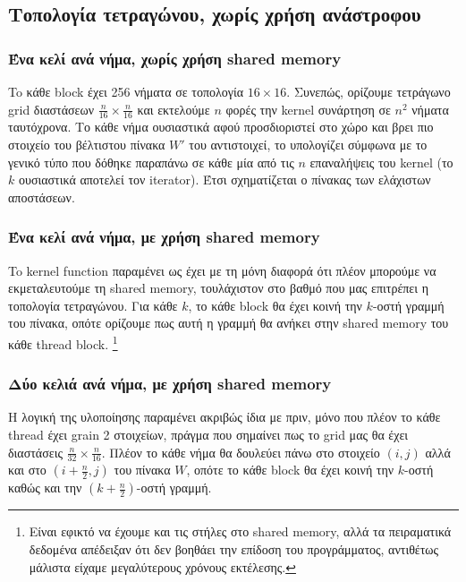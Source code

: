 \documentclass[11pt,a4paper,titlepage]{article}
\begin{document}
\subsection{Τοπολογία τετραγώνου, χωρίς χρήση ανάστροφου}

\subsubsection{Ένα κελί ανά νήμα, χωρίς χρήση shared memory}
To κάθε block έχει 256 νήματα σε τοπολογία $16 \times 16$. Συνεπώς, ορίζουμε τετράγωνο grid διαστάσεων $\tfrac{n}{16}\times\tfrac{n}{16}$ και εκτελούμε $n$ φορές την kernel συνάρτηση σε $n^2$ νήματα ταυτόχρονα. Το κάθε νήμα ουσιαστικά αφού προσδιοριστεί στο χώρο και βρει πιο στοιχείο του βέλτιστου πίνακα $W'$ του αντιστοιχεί, το υπολογίζει σύμφωνα με το γενικό τύπο που δόθηκε παραπάνω σε κάθε μία από τις $n$ επαναλήψεις του kernel (το $k$ ουσιαστικά αποτελεί τον iterator). Έτσι σχηματίζεται ο πίνακας των ελάχιστων αποστάσεων.

\subsubsection{Ένα κελί ανά νήμα, με χρήση shared memory}
To kernel function παραμένει ως έχει με τη μόνη διαφορά ότι πλέον μπορούμε να εκμεταλευτούμε τη shared memory, τουλάχιστον στο βαθμό που μας επιτρέπει η τοπολογία τετραγώνου. Για κάθε $k$, το κάθε block θα έχει κοινή την $k$-οστή γραμμή του πίνακα, οπότε ορίζουμε πως αυτή η γραμμή θα ανήκει στην shared memory του κάθε thread block. \footnote{Είναι εφικτό να έχουμε και τις στήλες στο shared memory, αλλά τα πειραματικά δεδομένα απέδειξαν ότι δεν βοηθάει την επίδοση του προγράμματος, αντιθέτως μάλιστα είχαμε μεγαλύτερους χρόνους εκτέλεσης.}

\subsubsection{Δύο κελιά ανά νήμα, με χρήση shared memory}
Η λογική της υλοποίησης παραμένει ακριβώς ίδια με πριν, μόνο που πλέον το κάθε thread έχει grain 2 στοιχείων, πράγμα που σημαίνει πως το grid μας θα έχει διαστάσεις $\tfrac{n}{32}\times\tfrac{n}{16}$. Πλέον το κάθε νήμα θα δουλεύει πάνω στο στοιχείο $(i, j)$ αλλά και στο $(i + \tfrac{n}{2}, j)$ του πίνακα $W$, οπότε το κάθε block θα έχει κοινή την $k$-οστή καθώς και την $(k+\tfrac{n}{2})$-οστή γραμμή.

\end{document}
